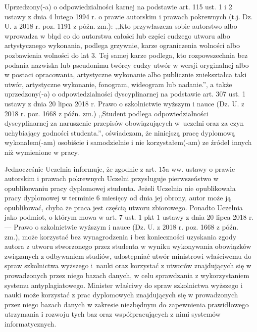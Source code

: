 \documentclass[a4paper,12pt]{article}
\begin{document}
{\sf Uprzedzony(-a) o odpowiedzialności karnej na podstawie art. 115 ust. 1 i 2 ustawy z dnia 4 lutego 1994 r. o prawie autorskim i prawach pokrewnych (t.j. Dz. U. z 2018 r. poz. 1191 z późn. zm.): ,,Kto przywłaszcza sobie autorstwo albo wprowadza w błąd co do autorstwa całości lub części cudzego utworu albo artystycznego wykonania, podlega grzywnie, karze ograniczenia wolności albo pozbawienia wolności do lat 3. Tej samej karze podlega, kto rozpowszechnia bez podania nazwiska lub pseudonimu twórcy cudzy utwór w wersji oryginalnej albo w postaci opracowania, artystyczne wykonanie albo publicznie zniekształca taki utwór, artystyczne wykonanie, fonogram, wideogram lub nadanie.'', a także uprzedzony(-a) o odpowiedzialności dyscyplinarnej na podstawie art. 307 ust. 1 ustawy z dnia 20 lipca 2018 r. Prawo o szkolnictwie wyższym i nauce (Dz. U. z 2018 r. poz. 1668 z późn. zm.) ,,Student podlega odpowiedzialności dyscyplinarnej za naruszenie przepisów obowiązujących w~uczelni oraz za czyn uchybiający godności studenta.'', oświadczam, że niniejszą pracę dyplomową wykonałem(-am) osobiście i samodzielnie i nie korzystałem(-am) ze źródeł innych niż wymienione w pracy.

\bigskip

Jednocześnie Uczelnia informuje, że zgodnie z art. 15a ww. ustawy o prawie autorskim i prawach pokrewnych Uczelni przysługuje pierwszeństwo w opublikowaniu pracy dyplomowej studenta. Jeżeli Uczelnia nie opublikowała pracy dyplomowej w terminie 6 miesięcy od dnia jej obrony, autor może ją opublikować, chyba że praca jest częścią utworu zbiorowego. Ponadto Uczelnia jako podmiot, o którym mowa w art. 7 ust. 1 pkt 1 ustawy z dnia 20 lipca 2018 r. --- Prawo o szkolnictwie wyższym i nauce (Dz. U. z 2018 r. poz. 1668 z późn. zm.), może korzystać bez wynagrodzenia i bez konieczności uzyskania zgody autora z utworu stworzonego przez studenta w wyniku wykonywania obowiązków związanych z odbywaniem studiów, udostępniać utwór ministrowi właściwemu do spraw szkolnictwa wyższego i~nauki oraz korzystać z utworów znajdujących się w prowadzonych przez niego bazach danych, w celu sprawdzania z wykorzystaniem systemu antyplagiatowego. Minister właściwy do spraw szkolnictwa wyższego i nauki może korzystać z prac dyplomowych znajdujących się w prowadzonych przez niego bazach danych w zakresie niezbędnym do zapewnienia prawidłowego utrzymania i rozwoju tych baz oraz współpracujących z nimi systemów informatycznych.}


\vspace{14ex}
\end{document}
